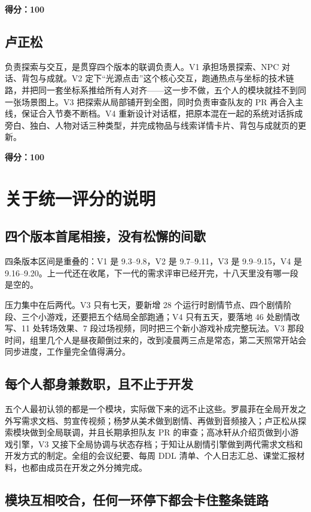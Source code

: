 \medskip
\noindent\textbf{得分：100}

\subsection{卢正松}

负责探索与交互，是贯穿四个版本的联调负责人。V1 承担场景探索、NPC 对话、背包与成就。V2 定下“光源点击”这个核心交互，跑通热点与坐标的技术链路，并把同一套坐标系推给所有人对齐——这一步不做，五个人的模块就挂不到同一张场景图上。V3 把探索从局部铺开到全图，同时负责审查队友的 PR 再合入主线，保证合入节奏不断档。V4 重新设计对话框，把原本混在一起的系统对话拆成旁白、独白、人物对话三种类型，并完成物品与线索详情卡片、背包与成就页的更新。

\medskip
\noindent\textbf{得分：100}

\section{关于统一评分的说明}

\subsection{四个版本首尾相接，没有松懈的间歇}

四条版本区间是重叠的：V1 是 9.3--9.8，V2 是 9.7--9.11，V3 是 9.9--9.15，V4 是 9.16--9.20。上一代还在收尾，下一代的需求评审已经开完，十八天里没有哪一段是空的。

压力集中在后两代。V3 只有七天，要新增 28 个运行时剧情节点、四个剧情阶段、三个小游戏，还要把五个结局全部跑通；V4 只有五天，要落地 46 处剧情改写、11 处转场效果、7 段过场视频，同时把三个新小游戏补成完整玩法。V3 那段时间，组里几个人是昼夜颠倒过来的，改到凌晨两三点是常态，第二天照常开站会同步进度，工作量完全值得满分。

\subsection{每个人都身兼数职，且不止于开发}

五个人最初认领的都是一个模块，实际做下来的远不止这些。罗晨菲在全局开发之外写需求文档、剪宣传视频；杨梦从美术做到剧情、再做到音频接入；卢正松从探索模块做到全局联调，并且长期承担队友 PR 的审查；高冰轩从介绍页做到小游戏引擎，V3 又接下全局协调与状态存档；于知让从剧情引擎做到两代需求文档和开发方式的制定。全组的会议纪要、每周 DDL 清单、个人日志汇总、课堂汇报材料，也都由成员在开发之外分摊完成。

\subsection{模块互相咬合，任何一环停下都会卡住整条链路}

